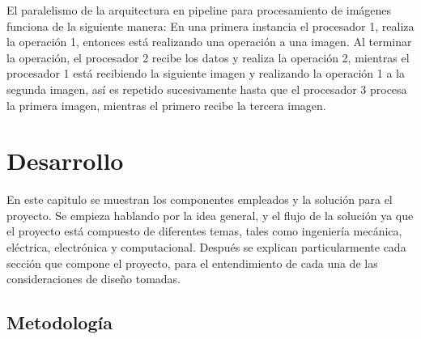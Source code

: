 \documentclass[twoside,spanish,ESP,MSc]{plantillaLabUPV}
\theoremstyle{definition}
\begin{document}
El paralelismo de la arquitectura en pipeline para procesamiento de imágenes funciona de la siguiente manera: En una primera instancia el procesador 1, realiza la operación 1, entonces está realizando una operación a una imagen. Al terminar la operación, el procesador 2 recibe los datos y realiza la operación 2, mientras el procesador 1 está recibiendo la siguiente imagen y realizando la operación 1 a la segunda imagen, así es repetido sucesivamente hasta que el procesador 3 procesa la primera imagen, mientras el primero recibe la tercera imagen. 


%
%
%
%
%
%



\chapter{Desarrollo}

En este capitulo se muestran los componentes empleados y la solución para el proyecto. Se empieza hablando por la idea general, y el flujo de la solución ya que el proyecto está compuesto de diferentes temas, tales como ingeniería mecánica, eléctrica, electrónica y computacional. Después se explican particularmente cada sección que compone el proyecto, para el entendimiento de cada una de las consideraciones de diseño tomadas.

\section{Metodología}
\end{document}
